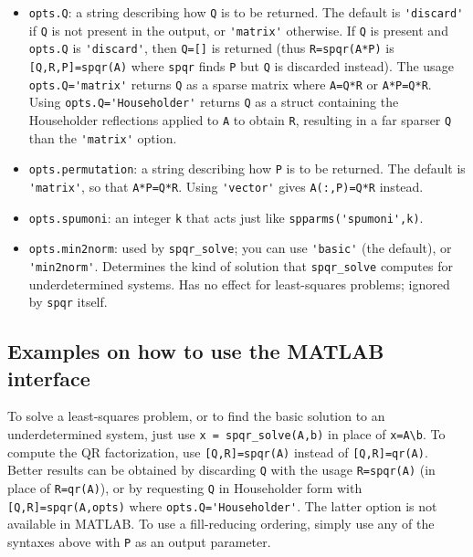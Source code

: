 \documentclass[12pt]{article}
\begin{document}
\begin{itemize}
       {\tt 'bestamd'}: try AMD and COLAMD and take the best.

       {\tt 'fixed'}: use \verb"P=I"; this is the only option if
       \verb"P" is not present in the output.

       {\tt 'natural'}: singleton removal only.

    \item \verb'opts.Q': a string describing how \verb'Q' is to be returned.
    The default is \verb"'discard'" if \verb'Q' is not present in the output,
    or \verb"'matrix'" otherwise.  If \verb'Q' is present and \verb'opts.Q' is
    \verb"'discard'", then \verb"Q=[]" is returned (thus \verb"R=spqr(A*P)" is
    \verb"[Q,R,P]=spqr(A)" where \verb"spqr" finds \verb"P" but \verb"Q" is
    discarded instead). The usage \verb"opts.Q='matrix'" returns \verb'Q' as a
    sparse matrix where \verb'A=Q*R' or \verb"A*P=Q*R".  Using
    \verb"opts.Q='Householder'" returns \verb'Q' as a struct containing the
    Householder reflections applied to \verb'A' to obtain \verb'R', resulting
    in a far sparser \verb'Q' than the \verb"'matrix'" option.

    \item \verb'opts.permutation': a string describing how \verb'P' is to be
    returned.  The default is \verb"'matrix'", so that \verb"A*P=Q*R".  Using
    \verb"'vector'" gives \verb"A(:,P)=Q*R" instead.

    \item \verb'opts.spumoni': an integer \verb'k' that
        acts just like \verb"spparms('spumoni',k)".

    \item \verb'opts.min2norm': used by \verb'spqr_solve'; you can use
    \verb"'basic'" (the default), or \verb"'min2norm'".  Determines the kind of
    solution that \verb'spqr_solve' computes for underdetermined systems.  Has
    no effect for least-squares problems; ignored by \verb'spqr' itself.

\end{itemize}

\subsection{Examples on how to use the MATLAB interface}

To solve a least-squares problem, or to find the basic solution to an
underdetermined system, just use \verb'x = spqr_solve(A,b)' in place of
\verb'x=A\b'.  To compute the QR factorization, use \verb'[Q,R]=spqr(A)'
instead of \verb'[Q,R]=qr(A)'.  Better results can be obtained by discarding
\verb'Q' with the usage \verb'R=spqr(A)' (in place of \verb'R=qr(A)'), or by
requesting \verb'Q' in Householder form with \verb'[Q,R]=spqr(A,opts)' where
\verb"opts.Q='Householder'".  The latter option is not available in MATLAB.  To
use a fill-reducing ordering, simply use any of the syntaxes above with
\verb'P' as an output parameter.
\end{document}
